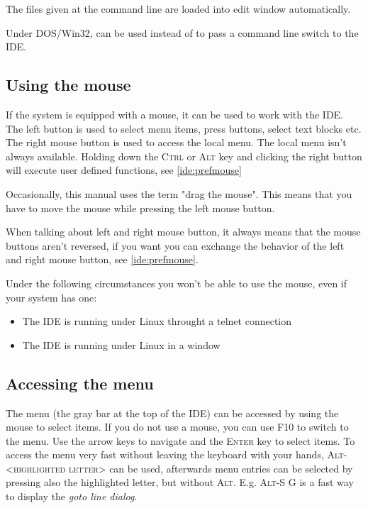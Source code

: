 The files given at the command line are loaded into edit
window automatically.

\begin{remark}
Under DOS/Win32, \var{/} can be used instead of \var{-} to pass a
command line switch to the IDE.
\end{remark}

\subsection{Using the mouse}
\label{ide:mouseusage}
If the system is equipped with a mouse, it can be used to work with the
IDE. The left button is used to select menu items, press buttons, select
text blocks etc. The right mouse button is used to access the local menu.
The local menu isn't always available. Holding down the \textsc{Ctrl} or
\textsc{Alt} key and clicking the right button will
execute user defined functions, see \ref{ide:prefmouse}

\begin{remark}
Occasionally, this manual uses the term "drag the mouse". This
means that you have to move the mouse while pressing the left
mouse button.
\end{remark}

\begin{remark}
When talking about left and right mouse button, it always means that the
mouse buttons aren't reversed, if you want you can exchange the
behavior of the left and right mouse button, see \ref{ide:prefmouse}.
\end{remark}

\begin{remark}
Under the following circumstances you won't be able to use the mouse,
even if your system has one:
\begin{itemize}
\item The IDE is running under Linux throught a telnet connection
\item The IDE is running under Linux in a window
\end{itemize}
\end{remark}

\subsection{Accessing the menu}
The menu (the gray bar at the top of the IDE) can be accessed by using
the mouse to select items. If you do not use a mouse, you can use
\textsc{F10} to switch to the menu. Use the arrow keys to navigate
and the \textsc{Enter} key to select items.
To access the menu very fast without leaving the
keyboard with your hands, \textsc{Alt-<highlighted letter>}
can be used, afterwards
menu entries can be selected by pressing also the highlighted letter, but
without \textsc{Alt}. E.g. \textsc{Alt-S G} is a fast way to
display the \emph{goto line dialog}.

